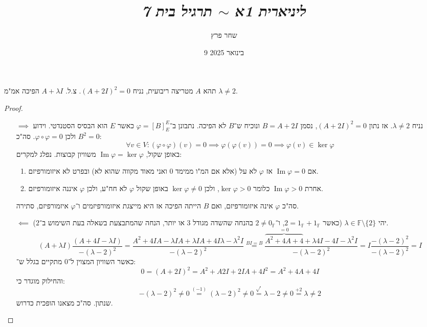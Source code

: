 \documentclass[]{article}
\author{שחר פרץ}
\title{\textit{ליניארית 1א $\sim$ תרגיל בית 7}}
\date{9 בינואר 2025}
\DeclareMathOperator\Img   {Im}
\newcommand\F         {\mathbb{F}}
\newcommand\co        {\colon}
\renewcommand\lg      {\lambda}
\renewcommand\phi     {\varphi}
\begin{document}
	\maketitle
	
	\section{}
	תהא $A$ מטריצה ריבועית, נניח $(A + 2I)^2 = 0$. צ.ל. $A + \lg I$ הפיכה אמ"מ $\lg \neq 2$.
	\begin{proof}\,
		\begin{enumerate}
			\item[$\implies$]נניח $\lg \neq 2$. אז נתון $(A + 2I)^2 = 0$, נסמן $B = A + 2I$ ונוכיח ש־$B$ לא הפיכה. נתבונן ב־$\phi = [B]^E_E$ כאשר $E$ הוא הבסיס הסטנדטי. וידוע $B^2 = 0$ ולכן $\phi \circ \phi = 0$. סה"כ: 
			\[ \forall v \in V \co (\phi \circ \phi)(v) = 0 \implies \phi(\phi(v)) = 0 \implies \phi(v) \in \ker \phi \]
			באופן שקול, $\Img\phi = \ker \phi$ משוויון קבוצות. נפלג למקרים: 
			\begin{enumerate}
				\item אם $\Img\phi = 0$ אז $\phi$ לא על (אלא אם המ"ו ממימד $0$ ואני מאוד מקווה שהוא לא) ובפרט לא איזומורפיזם. 
				\item אחרת $\Img\phi > 0$ כלומר $\ker\phi > 0$, ולכן $\ker \phi \neq 0$ באופן שקול $\phi$ לא חח"ע, ולכן $\phi$ איננה איזומורפיזם. 
			\end{enumerate}
			סה"כ $\phi$ אינה איזומורפיזם, ואם $B$ הייתה הפיכה אז היא מייצגת איזומורפיזמים ו־$\phi$ איזמורפיזם, סתירה. 
			\item[$\impliedby$]יהי $\lg \in \F \setminus \{2\}$ (כאשר $2 = 1_\F + 1_\F$, ו־$2 \neq 0_\F$ בהנחה שהשדה מגודל $3$ או יותר, הנחה שהמתבצעת בשאלה בעת השימוש ב־$2$). 
			\[ (A + \lg I)\frac{(A + 4I - \lg I)}{-(\lg - 2)^2} = \frac{A^2 + 4IA - \lg IA + \lg I A+ 4I\lg - \lg^2 I}{-(\lg - 2)^2} \overset{BI = B}{=} 
			\frac{\overbrace{A^2 + 4A + 4}^{=0} + \lg 4I - 4I - \lg^2 I}{-(\lg - 2)^2} = I\frac{-(\lg - 2)^2}{-(\lg - 2)^2} = I \]
			כאשר השוויון המצוין ל־$0$ מתקיים בגלל ש־: 
			\[ 0 = (A + 2I)^2 = A^2 + A2I + 2IA + 4I^2 = A^2 + 4A + 4I \]
			והחילוק מוגדר כי: 
			\[ -(\lg - 2)^2 \neq 0 \overset{(-1)}{=} (\lg - 2)^2 \neq 0 \overset{\sqrt{\, }}{=} \lg - 2 \neq 0 \overset{+2}{=} \lg \neq 2 \]
			שנתון. סה"כ מצאנו הופכית כדרוש. 
		\end{enumerate} 
	\end{proof}
	
\end{document}
